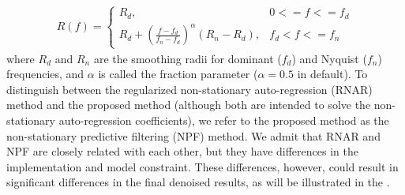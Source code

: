 \begin{align}
\label{eq:fs}
R(f) = \left\{\begin{array}{ll}
R_d, & 0<=f<=f_d \\
R_d+\left(\frac{f-f_d}{f_n-f_d}\right)^{\alpha}\left(R_n-R_d\right),& f_d<f<=f_n
\end{array} \right.
\end{align}
where $R_d$ and $R_n$ are the smoothing radii for dominant ($f_d$) and Nyquist ($f_n$) frequencies, and $\alpha$ is called the fraction parameter ($\alpha=0.5$ in default).  To distinguish between the regularized non-stationary auto-regression (RNAR) method and the proposed method (although both are intended to solve the non-stationary auto-regression coefficients), we refer to the proposed method as the non-stationary predictive filtering (NPF) method. We admit that RNAR and NPF are closely related with each other, but they have differences in the implementation and model constraint. These differences, however, could result in significant differences in the final denoised results, as will be illustrated in the . 

